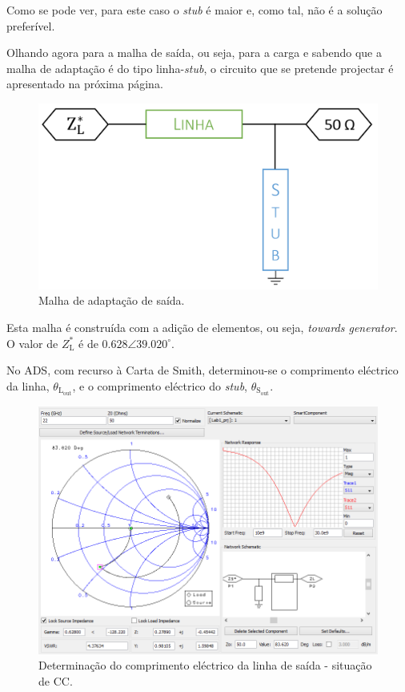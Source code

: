 \documentclass[11pt]{article}
\numberwithin{equation}{section}
\begin{document}
Como se pode ver, para este caso o \textit{stub} é maior e, como tal, não é a solução preferível.

Olhando agora para a malha de saída, ou seja, para a carga e sabendo que a malha de adaptação é do tipo linha-\textit{stub}, o circuito que se pretende projectar é apresentado na próxima página.

\begin{figure}[H]
	\centering
	\includegraphics[keepaspectratio=true, scale=0.25]{teoricas/malhasaida}
	\vspace{-0.5em}
	\caption{Malha de adaptação de saída.}
	\vspace{-0.8em}
\end{figure}

Esta malha é construída com a adição de elementos, ou seja, \textit{towards generator}. O valor de $Z_{\text{L}}^{*}$ é de $0.628\angle39.020 ^{\circ}$.

No ADS, com recurso à Carta de Smith, determinou-se o comprimento eléctrico da linha, $\theta_{\text{L}_{\text{out}}}$, e o comprimento eléctrico do \textit{stub}, $\theta_{\text{S}_{\text{out}}}$. 

\begin{figure}[H]
	\centering
	\includegraphics[keepaspectratio=true, scale=0.45]{exps/Carga_CC_line}
	\vspace{-0.5em}
	\caption{Determinação do comprimento eléctrico da linha de saída - situação de CC.}
	\vspace{-0.8em}
\end{figure}
\end{document}

